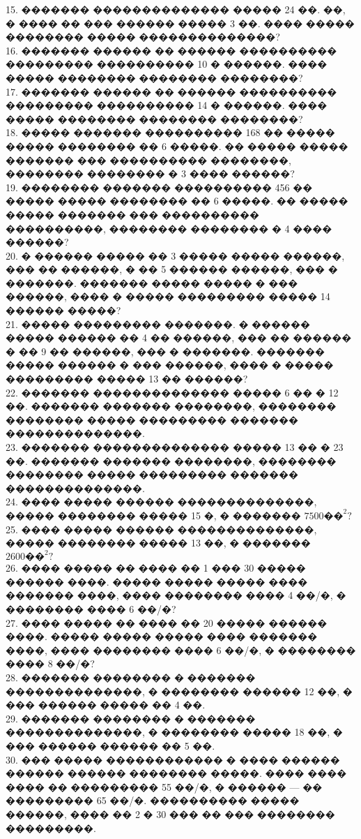 \documentclass[12pt]{article}
\begin{document}
15. ������� �������������� ����� 24 ��. ��, � ���� �� ��� ������ ����� 3 ��. ���� ����� �������� ����� ��������������?\\
16. ������� ������ �� ������ ���������� ��������� ���������� 10 � ������. ���� ����� �������� �������� ��������?\\
17. ������� ������ �� ������ ���������� ��������� ���������� 14 � ������. ���� ����� �������� �������� ��������?\\
18. ����� ������� ���������� 168 �� ����� ����� �������� �� 6 �����. �� ����� ����� ������� ��� ���������� ��������, �������� �������� � 3 ���� ������?\\
19. �������� ������� ���������� 456 �� ����� ����� �������� �� 6 �����. �� ����� ����� ������� ��� ���������� ����������, �������� �������� � 4 ���� ������?\\
20. � ������ ����� �� 3 ����� ����� ������, ��� �� ������, � �� 5 ������ ������, ��� � �������. ������� ����� ����� � ��� ������, ���� � ����� ��������� ����� 14 ������ �����?\\
21. ����� ��������� �������. � ������ ����� ������ �� 4 �� ������, ��� �� ������ � �� 9 �� ������, ��� � �������. ������� ����� ������ � ��� ������, ���� � ����� ��������� ����� 13 �� ������?\\
22. ������� �������������� ����� 6 �� � 12 ��. ������� ������� ��������, �������� �������� ����� ��������� ������� ��������������.\\
23. ������� �������������� ����� 13 �� � 23 ��. ������� ������� ��������, �������� �������� ����� ��������� ������� ��������������.\\
24. ���� ����� ������ ��������������, ����� �������� ����� 15 �, � ������� $7500\text{��}^2?$\\
25. ���� ����� ������ ��������������, ����� �������� ����� 13 ��, � ������� $2600\text{��}^2?$\\
26. ���� ����� �� ���� �� 1 ��� 30 ����� ������ ����. ����� ����� ����� ���� ������� ����, ���� �������� ���� 4 ��/�, � �������� ���� 6 ��/�?\\
27. ���� ����� �� ���� �� 20 ����� ������ ����. ����� ����� ����� ���� ������� ����, ���� �������� ���� 6 ��/�, � �������� ���� 8 ��/�?\\
28. ������� �������� � ������� ��������������, � �������� ������ 12 ��, � ��� ������ ����� �� 4 ��.\\
29. ������� �������� � ������� ��������������, � �������� ����� 18 ��, � ��� ������ ������ �� 5 ��.\\
30. ��� ����� ������������ � ���� ������ ������ ������ �������� �����. ���� ���� ���� �� ��������� 55 ��/�, � ������ --- �� ��������� 65 ��/�. ���������� ����� ������, ���� �� 2 � 30 ��� �� ��� �������� ���������.\\
\end{document}
